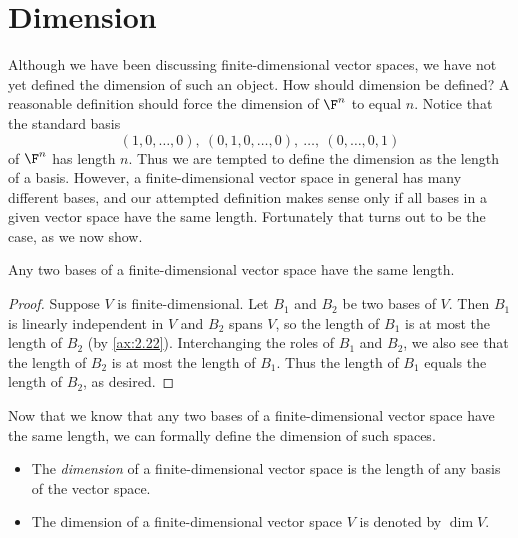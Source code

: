 \iftestbuild %
\setcounter{section}{2}\setcounter{theorem}{33}
\fi %
\providecommand\axeqnum[1]{\refstepcounter{theorem}\tag*{\thetheorem}\label{ax:#1}}
\section{Dimension}

Although we have been discussing finite-dimensional vector spaces, we have not
yet defined the dimension of such an object. How should dimension be defined? A
reasonable definition should force the dimension of $\F^n$ to equal $n$. Notice
that the standard basis
\[ (1,0,\dots,0),\ (0,1,0,\dots,0),\ \dots,\ (0,\dots,0,1) \]
of $\F^n$ has length $n$. Thus we are tempted to define the dimension as the
length of a basis. However, a finite-dimensional vector space in general has
many different bases, and our attempted definition makes sense only if all bases
in a given vector space have the same length. Fortunately that turns out to be
the case, as we now show.

\begin{result}\label{ax:2.34}
Any two bases of a finite-dimensional vector space have the same length.
\end{result}

\begin{proof}
Suppose $V$ is finite-dimensional. Let $B_1$ and $B_2$ be two bases of $V$. Then
$B_1$ is linearly independent in $V$ and $B_2$ spans $V$, so the length of $B_1$
is at most the length of $B_2$ (by \ref{ax:2.22}). Interchanging the roles of
$B_1$ and $B_2$, we also see that the length of $B_2$ is at most the length of
$B_1$. Thus the length of $B_1$ equals the length of $B_2$, as desired.
\end{proof}

Now that we know that any two bases of a finite-dimensional vector space have
the same length, we can formally define the dimension of such spaces.

\begin{definition}\label{ax:2.35}\leavevmode
\begin{itemize}
\item The \emph{dimension} of a finite-dimensional vector space is the length
  of any basis of the vector space.
\item The dimension of a finite-dimensional vector space $V$ is denoted by
  $\dim V$.
\end{itemize}
\end{definition}

